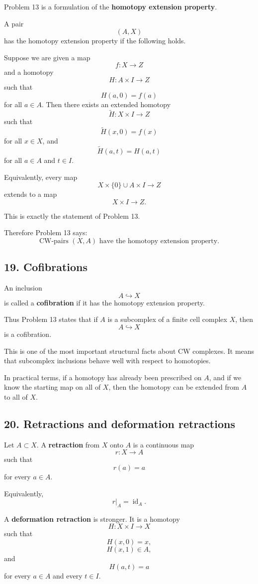 \documentclass[12pt,a4paper]{article}
\theoremstyle{notespace}
\begin{document}
Problem 13 is a formulation of the \textbf{homotopy extension property}.

A pair
\[
(A,X)
\]
has the homotopy extension property if the following holds.

Suppose we are given a map
\[
f:X\to Z
\]
and a homotopy
\[
H:A\times I\to Z
\]
such that
\[
H(a,0)=f(a)
\]
for all \(a\in A\). Then there exists an extended homotopy
\[
\widetilde H:X\times I\to Z
\]
such that
\[
\widetilde H(x,0)=f(x)
\]
for all \(x\in X\), and
\[
\widetilde H(a,t)=H(a,t)
\]
for all \(a\in A\) and \(t\in I\).

Equivalently, every map
\[
X\times\{0\}\cup A\times I\to Z
\]
extends to a map
\[
X\times I\to Z.
\]

This is exactly the statement of Problem 13.

Therefore Problem 13 says:
\[
\boxed{
	\text{CW-pairs }(X,A)\text{ have the homotopy extension property.}
}
\]

\subsection*{19. Cofibrations}

An inclusion
\[
A\hookrightarrow X
\]
is called a \textbf{cofibration} if it has the homotopy extension property.

Thus Problem 13 states that if \(A\) is a subcomplex of a finite cell complex \(X\), then
\[
A\hookrightarrow X
\]
is a cofibration.

This is one of the most important structural facts about CW complexes. It means that subcomplex inclusions behave well with respect to homotopies.

In practical terms, if a homotopy has already been prescribed on \(A\), and if we know the starting map on all of \(X\), then the homotopy can be extended from \(A\) to all of \(X\).

\subsection*{20. Retractions and deformation retractions}

Let \(A\subset X\). A \textbf{retraction} from \(X\) onto \(A\) is a continuous map
\[
r:X\to A
\]
such that
\[
r(a)=a
\]
for every \(a\in A\).

Equivalently,
\[
r|_A=\operatorname{id}_A.
\]

A \textbf{deformation retraction} is stronger. It is a homotopy
\[
H:X\times I\to X
\]
such that
\[
H(x,0)=x,
\]
\[
H(x,1)\in A,
\]
and
\[
H(a,t)=a
\]
for every \(a\in A\) and every \(t\in I\).
\end{document}
